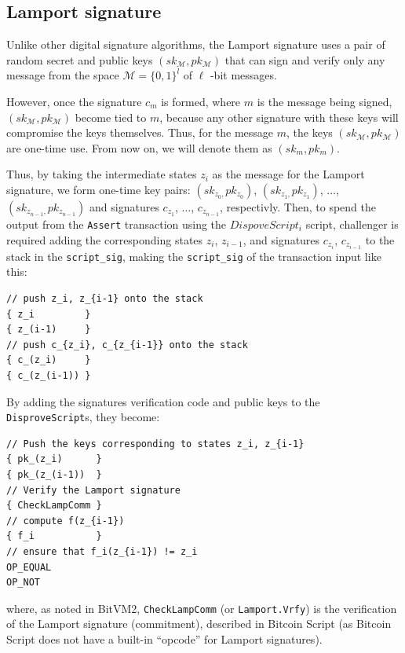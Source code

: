 \documentclass[11pt]{article}
\begin{document}
\subsection{Lamport signature}\label{sec:lamport-signature}

Unlike other digital signature algorithms, the Lamport signature uses
a pair of random secret and public keys \((sk_{\mathcal{M}},
pk_{\mathcal{M}})\) that can sign and verify only any message from the
space \(\mathcal{M} = {\{0, 1\}}^{l}\) of \(\ell\) -bit messages.

However, once the signature \(c_{m}\) is formed, where \(m\) is the message
being signed, \((sk_{\mathcal{M}}, pk_{\mathcal{M}})\) become tied to \(m\),
because any other signature with these keys will compromise the keys
themselves. Thus, for the message \(m\), the keys \((sk_{\mathcal{M}},
pk_{\mathcal{M}})\) are one-time use. From now on, we will denote them as
\((sk_{m}, pk_m)\).

Thus, by taking the intermediate states \(z_i\) as the message for the
Lamport signature, we form one-time key pairs: \((sk_{z_0,
}pk_{z_0})\), \((sk_{z_1, }pk_{z_1})\), \(\ldots\), \((sk_{z_{n-1},
}pk_{z_{n-1}})\) and signatures \(c_{z_1}\), \(\ldots\),
\(c_{z_{n-1}}\), respectivly. Then, to spend the output from the
\texttt{Assert} transaction using the \(DispoveScript_i\) script,
challenger is required adding the corresponding states \(z_i\),
\(z_{i-1}\), and signatures \(c_{z_{i}}\), \(c_{z_{i-1}}\) to the
stack in the \texttt{script\_sig}, making the \texttt{script\_sig} of
the transaction input like this:

\begin{verbatim}
// push z_i, z_{i-1} onto the stack
{ z_i         }
{ z_(i-1)     }
// push c_{z_i}, c_{z_{i-1}} onto the stack
{ c_(z_i)     }
{ c_(z_(i-1)) }
\end{verbatim}

By adding the signatures verification code and public keys to the
\texttt{DisproveScript}s, they become:

\begin{verbatim}
// Push the keys corresponding to states z_i, z_{i-1}
{ pk_(z_i)      }
{ pk_(z_(i-1))  }
// Verify the Lamport signature
{ CheckLampComm }
// compute f(z_{i-1})
{ f_i           }
// ensure that f_i(z_{i-1}) != z_i
OP_EQUAL
OP_NOT
\end{verbatim}

where, as noted in BitVM2, \texttt{CheckLampComm} (or
\texttt{Lamport.Vrfy}) is the verification of the Lamport signature
(commitment), described in Bitcoin Script (as Bitcoin Script does not
have a built-in ``opcode'' for Lamport signatures).
\end{document}

